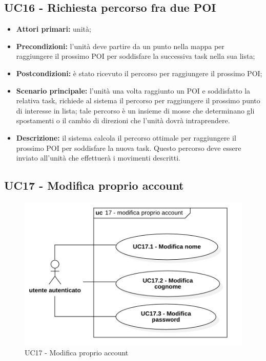 \subsection{UC16 - Richiesta percorso fra due POI}
\begin{itemize}
	\item 	\textbf{Attori primari:} unità;
	\item 	\textbf{Precondizioni:} l'unità deve partire da un punto nella mappa per raggiungere il prossimo POI per soddisfare la successiva task nella sua lista;
	\item 	\textbf{Postcondizioni:} è stato ricevuto il percorso per raggiungere il prossimo POI;
	\item 	\textbf{Scenario principale:} l'unità una volta raggiunto un POI e soddisfatto la relativa task, richiede al sistema il percorso per raggiungere il prossimo punto di interesse in lista; tale percorso è un insieme di mosse che determinano gli spostamenti o il cambio di direzioni che l'unità dovrà intraprendere.
	\item 	\textbf{Descrizione:} il sistema calcola il percorso ottimale per raggiungere il prossimo POI per soddisfare la nuova task. Questo percorso deve essere inviato all'unità che effettuerà i movimenti descritti.
	
\end{itemize}

\subsection{UC17 - Modifica proprio account}

\begin{figure}[H]
	\centering
	\includegraphics[scale=0.52]{res/images/uc17.png}
	\caption{UC17 - Modifica proprio account}
\end{figure}

